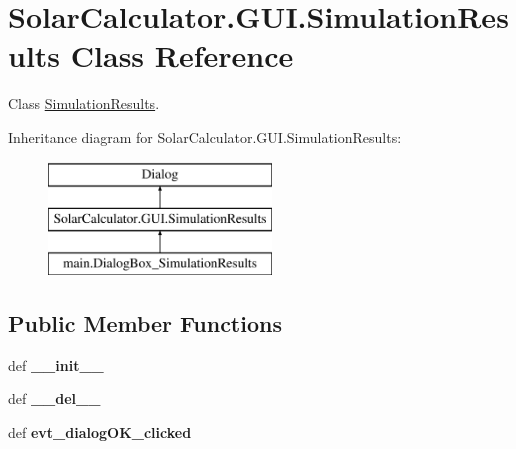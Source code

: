 \hypertarget{class_solar_calculator_1_1_g_u_i_1_1_simulation_results}{\section{Solar\-Calculator.\-G\-U\-I.\-Simulation\-Results Class Reference}
\label{class_solar_calculator_1_1_g_u_i_1_1_simulation_results}
}


Class \hyperlink{class_solar_calculator_1_1_g_u_i_1_1_simulation_results}{Simulation\-Results}.  


Inheritance diagram for Solar\-Calculator.\-G\-U\-I.\-Simulation\-Results\-:\begin{figure}[H]
\begin{center}
\leavevmode
\includegraphics[height=3.000000cm]{class_solar_calculator_1_1_g_u_i_1_1_simulation_results}
\end{center}
\end{figure}
\subsection*{Public Member Functions}
\begin{DoxyCompactItemize}
\item 
\hypertarget{class_solar_calculator_1_1_g_u_i_1_1_simulation_results_ad9b6cc015514eff9fa551b7e241479e5}{def {\bfseries \-\_\-\-\_\-init\-\_\-\-\_\-}}\label{class_solar_calculator_1_1_g_u_i_1_1_simulation_results_ad9b6cc015514eff9fa551b7e241479e5}

\item 
\hypertarget{class_solar_calculator_1_1_g_u_i_1_1_simulation_results_a2e010ea6500e6e4b5312c6f807f23d62}{def {\bfseries \-\_\-\-\_\-del\-\_\-\-\_\-}}\label{class_solar_calculator_1_1_g_u_i_1_1_simulation_results_a2e010ea6500e6e4b5312c6f807f23d62}

\item 
\hypertarget{class_solar_calculator_1_1_g_u_i_1_1_simulation_results_ae56ed255fd1e8cb9ccbb65c96ee99681}{def {\bfseries evt\-\_\-dialog\-O\-K\-\_\-clicked}}\label{class_solar_calculator_1_1_g_u_i_1_1_simulation_results_ae56ed255fd1e8cb9ccbb65c96ee99681}

\end{DoxyCompactItemize}
